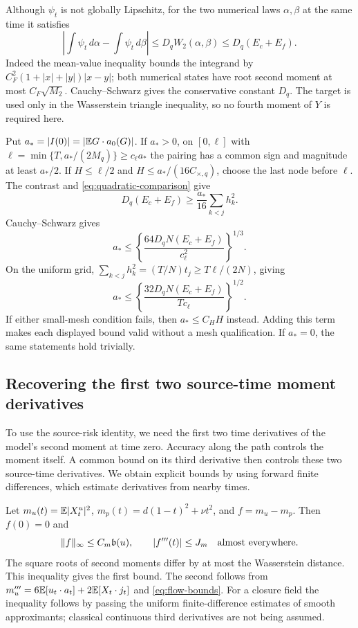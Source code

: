 Although $\psi_t$ is not globally Lipschitz, for the two numerical laws
$\alpha,\beta$ at the same time it satisfies
\begin{equation}
 \left|\int\psi_t\,d\alpha-\int\psi_t\,d\beta\right|
 \le D_qW_2(\alpha,\beta)\le D_q(E_c+E_f).
 \label{eq:quadratic-comparison}
\end{equation}
Indeed the mean-value inequality bounds the integrand by
$C_F^2(1+|x|+|y|)|x-y|$; both numerical states have root second moment at
most $C_F\sqrt{M_2}$. Cauchy--Schwarz gives the conservative constant $D_q$.
The target is used only in the Wasserstein triangle inequality, so no
fourth moment of $Y$ is required here.

Put $a_*=|I(0)|=|\mathbb E G\cdot a_0(G)|$. If $a_*>0$, on
$[0,\ell]$ with $\ell=\min\{T,a_* /(2M_q)\}\ge c_\ell a_*$ the
pairing has a common sign and magnitude at least $a_*/2$.
If $H\le\ell/2$ and $H\le a_* /(16C_{\times,q})$, choose the last node
before $\ell$. The contrast and \eqref{eq:quadratic-comparison} give
\[
 D_q(E_c+E_f)\ge\frac{a_*}{16}\sum_{k<j}h_k^2.
\]
Cauchy--Schwarz gives
\begin{equation}
 a_*\le\left\{\frac{64D_qN(E_c+E_f)}{c_\ell^2}\right\}^{1/3}.
 \label{eq:cubic-observe}
\end{equation}
On the uniform grid, $\sum_{k<j}h_k^2=(T/N)t_j\ge T\ell/(2N)$, giving
\begin{equation}
 a_*\le\left\{\frac{32D_qN(E_c+E_f)}{Tc_\ell}\right\}^{1/2}.
 \label{eq:square-observe}
\end{equation}
If either small-mesh condition fails, then $a_*\le C_HH$ instead.
Adding this term makes each displayed bound valid without a mesh
qualification. If $a_*=0$, the same statements hold trivially.

\subsection{Recovering the first two source-time moment derivatives}
To use the source-risk identity, we need the first two time derivatives of
the model's second moment at time zero. Accuracy along the path controls
the moment itself. A common bound on its third derivative then controls
these two source-time derivatives. We obtain explicit bounds by using
forward finite differences, which estimate derivatives from nearby times.

Let $m_u(t)=\mathbb E|X_t^u|^2$,
$m_p(t)=d(1-t)^2+\nu t^2$, and $f=m_u-m_p$.
Then $f(0)=0$ and
\begin{equation}
 \|f\|_\infty\le C_m\mathfrak b(u),\qquad
 |f'''(t)|\le J_m\quad\hbox{almost everywhere}.
 \label{eq:moment-bias}
\end{equation}
The square roots of second moments differ by at most the Wasserstein
distance. This inequality gives the first bound. The second follows from
$m_u'''=6\mathbb E[u_t\cdot a_t]+2\mathbb E[X_t\cdot j_t]$ and
\eqref{eq:flow-bounds}. For a closure field the inequality follows by
passing the uniform finite-difference estimates of smooth approximants;
classical continuous third derivatives are not being assumed.

